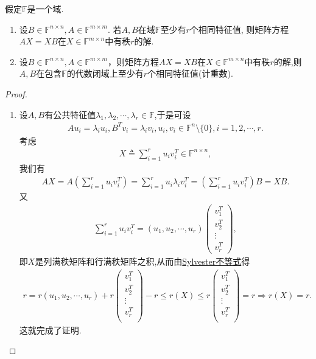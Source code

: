 \documentclass[../../main.tex]{subfiles}%
\begin{document}
\begin{proposition}\label{proposition:AX-XB相关命题....1}
假定$\mathbb{F}$是一个域.
\begin{enumerate}[(1)]
\item 设$B \in \mathbb{F}^{n \times n}, A \in \mathbb{F}^{m \times m}$. 若$A,B$在域$\mathbb{F}$至少有$r$个相同特征值, 则矩阵方程$AX = XB$在$X \in \mathbb{F}^{m \times n}$中有秩$r$的解.

\item 设$B\in\mathbb{F}^{n\times n}, A\in\mathbb{F}^{m\times m}$，则矩阵方程$AX = XB$在$X\in\mathbb{F}^{m\times n}$中有秩$r$的解,则$A,B$在包含$\mathbb{F}$的代数闭域上至少有$r$个相同特征值(计重数).
\end{enumerate}
\end{proposition}
\begin{proof}
\begin{enumerate}[(1)]
\item 设$A,B$有公共特征值$\lambda_1,\lambda_2,\cdots,\lambda_r\in\mathbb{F}$,于是可设
\begin{align*}
Au_i=\lambda_i u_i,B^T v_i=\lambda_i v_i,u_i,v_i\in\mathbb{F}^n\setminus\{0\},i=1,2,\cdots,r.
\end{align*}
考虑
\begin{align*}
X\triangleq\sum_{i=1}^r u_i v_i^T\in\mathbb{F}^{n\times n},
\end{align*}
我们有
\begin{align*}
AX = A\left( \sum_{i=1}^r u_i v_i^T \right) = \sum_{i=1}^r u_i \lambda_i v_i^T = \left( \sum_{i=1}^r u_i v_i^T \right) B = XB.
\end{align*}
又
\begin{align*}
\sum_{i=1}^r u_i v_i^T = (u_1,u_2,\cdots,u_r) \begin{pmatrix} v_1^T \\ v_2^T \\ \vdots \\ v_r^T \end{pmatrix},
\end{align*}
即$X$是列满秩矩阵和行满秩矩阵之积,从而由\hyperref[proposition:Sylvester(西尔维斯特)不等式]{Sylvester不等式}得
\begin{align*}
r=r(u_1,u_2,\cdots ,u_r)+r\left( \begin{array}{c}
v_{1}^{T}\\
v_{2}^{T}\\
\vdots\\
v_{r}^{T}\\
\end{array} \right) -r\leqslant r(X)\leqslant r\left( \begin{array}{c}
v_{1}^{T}\\
v_{2}^{T}\\
\vdots\\
v_{r}^{T}\\
\end{array} \right) =r\Longrightarrow r(X)=r.
\end{align*}
这就完成了证明.


\end{enumerate}
\end{proof}
\end{document}

